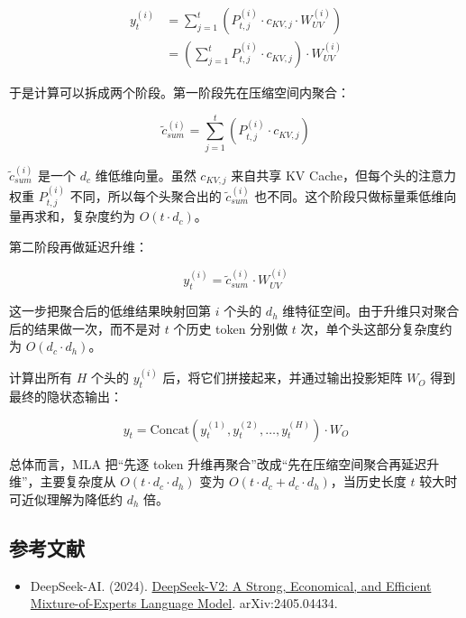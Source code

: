 \[
\begin{aligned}
y_t^{(i)}
&= \sum_{j=1}^{t}\left(P_{t,j}^{(i)} \cdot c_{KV,j} \cdot W_{UV}^{(i)}\right) \\
&= \left(\sum_{j=1}^{t}P_{t,j}^{(i)} \cdot c_{KV,j}\right) \cdot W_{UV}^{(i)}
\end{aligned}
\]

于是计算可以拆成两个阶段。第一阶段先在压缩空间内聚合：

\[
\tilde c_{sum}^{(i)}
=
\sum_{j=1}^{t}\left(P_{t,j}^{(i)} \cdot c_{KV,j}\right)
\]

\(\tilde c_{sum}^{(i)}\) 是一个 \(d_c\) 维低维向量。虽然 \(c_{KV,j}\) 来自共享 KV Cache，但每个头的注意力权重 \(P_{t,j}^{(i)}\) 不同，所以每个头聚合出的 \(\tilde c_{sum}^{(i)}\) 也不同。这个阶段只做标量乘低维向量再求和，复杂度约为 \(O(t \cdot d_c)\)。

第二阶段再做延迟升维：

\[
y_t^{(i)} = \tilde c_{sum}^{(i)} \cdot W_{UV}^{(i)}
\]

这一步把聚合后的低维结果映射回第 \(i\) 个头的 \(d_h\) 维特征空间。由于升维只对聚合后的结果做一次，而不是对 \(t\) 个历史 token 分别做 \(t\) 次，单个头这部分复杂度约为 \(O(d_c \cdot d_h)\)。

计算出所有 \(H\) 个头的 \(y_t^{(i)}\) 后，将它们拼接起来，并通过输出投影矩阵 \(W_O\) 得到最终的隐状态输出：

\[
y_t
=
\mathrm{Concat}\left(y_t^{(1)}, y_t^{(2)}, \ldots, y_t^{(H)}\right) \cdot W_O
\]

总体而言，MLA 把``先逐 token 升维再聚合''改成``先在压缩空间聚合再延迟升维''，主要复杂度从 \(O(t \cdot d_c \cdot d_h)\) 变为 \(O(t \cdot d_c + d_c \cdot d_h)\)，当历史长度 \(t\) 较大时可近似理解为降低约 \(d_h\) 倍。

\FloatBarrier
{}
\hypertarget{ux53c2ux8003ux6587ux732e-95}{%
\subsection{参考文献}\label{ux53c2ux8003ux6587ux732e-95}}

\vspace{0.25em}
\begin{itemize}
\tightlist
\item
  DeepSeek-AI. (2024). \href{https://arxiv.org/abs/2405.04434}{DeepSeek-V2: A Strong, Economical, and Efficient Mixture-of-Experts Language Model}. arXiv:2405.04434.
\end{itemize}

\clearpage
